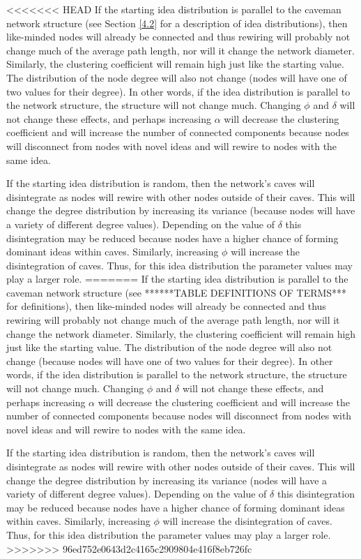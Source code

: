 <<<<<<< HEAD
If the starting idea distribution is parallel to the caveman network structure (see Section \ref{4.2} for a description of idea distributions), then like-minded nodes will already be connected and thus rewiring will probably not change much of the average path length, nor will it change the network diameter. Similarly, the clustering coefficient will remain high just like the starting value. The distribution of the node degree will also not change (nodes will have one of two values for their degree). In other words, if the idea distribution is parallel to the network structure, the structure will not change much. Changing $\phi$ and $\delta$ will not change these effects, and perhaps increasing $\alpha$ will decrease the clustering coefficient and will increase the number of connected components because nodes will disconnect from nodes with novel ideas and will rewire to nodes with the same idea.

If the starting idea distribution is random, then the network's caves will disintegrate as nodes will rewire with other nodes outside of their caves. This will change the degree distribution by increasing its variance (because nodes will have a variety of different degree values). Depending on the value of $\delta$ this disintegration may be reduced because nodes have a higher chance of forming dominant ideas within caves. Similarly, increasing $\phi$ will increase the disintegration of caves. Thus, for this idea distribution the parameter values may play a larger role.
=======
If the starting idea distribution is parallel to the caveman network structure (see ******TABLE DEFINITIONS OF TERMS*** for definitions), then like-minded nodes will already be connected and thus rewiring will probably not change much of the average path length, nor will it change the network diameter. Similarly, the clustering coefficient will remain high just like the starting value. The distribution of the node degree will also not change (because nodes will have one of two values for their degree). In other words, if the idea distribution is parallel to the network structure, the structure will not change much. Changing $\phi$ and $\delta$ will not change these effects, and perhaps increasing $\alpha$ will decrease the clustering coefficient and will increase the number of connected components because nodes will disconnect from nodes with novel ideas and will rewire to nodes with the same idea.

If the starting idea distribution is random, then the network's caves will disintegrate as nodes will rewire with other nodes outside of their caves. This will change the degree distribution by increasing its variance (nodes will have a variety of different degree values). Depending on the value of $\delta$ this disintegration may be reduced because nodes have a higher chance of forming dominant ideas within caves. Similarly, increasing $\phi$ will increase the disintegration of caves. Thus, for this idea distribution the parameter values may play a larger role.
>>>>>>> 96ed752e0643d2c4165c2909804e416f8eb726fc

